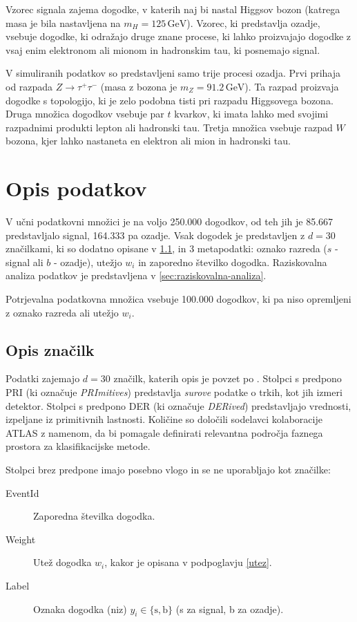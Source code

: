 \documentclass[11pt,a4paper,openany]{book}
\begin{document}
Vzorec signala zajema dogodke, v katerih naj bi nastal Higgsov bozon (katrega masa je bila nastavljena na $m_H = 125\,\text{GeV}$). Vzorec, ki predstavlja ozadje, vsebuje dogodke, ki odražajo druge znane procese, ki lahko proizvajajo dogodke z vsaj enim elektronom ali mionom in hadronskim tau, ki posnemajo signal.

V simuliranih podatkov so predstavljeni samo trije procesi ozadja. Prvi prihaja od razpada $Z \rightarrow \tau^+\tau^-$ (masa z bozona je $m_Z = 91.2\,\text{GeV}$). Ta razpad proizvaja dogodke s topologijo, ki je zelo podobna tisti pri razpadu Higgsovega bozona. Druga množica dogodkov vsebuje par $t$ kvarkov, ki imata lahko med svojimi razpadnimi produkti lepton ali hadronski tau. Tretja množica vsebuje razpad $W$ bozona, kjer lahko nastaneta en elektron ali mion in hadronski tau. 

\section{Opis podatkov}
\label{ch:opis_podatkov}

V učni podatkovni množici je na voljo 250.000 dogodkov, od teh jih je 85.667 predstavljalo signal, 164.333 pa ozadje. Vsak dogodek je predstavljen z $d = 30$ značilkami, ki so dodatno opisane v \ref{sec:opis-znacilk}, in 3 metapodatki: oznako razreda ($s$ - signal ali $b$ - ozadje), utežjo $w_i$ in zaporedno številko dogodka. Raziskovalna analiza podatkov je predstavljena v \ref{sec:raziskovalna-analiza}.

Potrjevalna podatkovna množica vsebuje 100.000 dogodkov, ki pa niso opremljeni z oznako razreda ali utežjo $w_i$. 

\subsection{Opis značilk}
\label{sec:opis-znacilk}
Podatki zajemajo $d = 30$ značilk, katerih opis je povzet po \cite{Adam-Bourdarios14}. Stolpci s predpono PRI (ki označuje \textit{PRImitives}) predstavlja \textit{surove} podatke o trkih, kot jih izmeri detektor. Stolpci s predpono DER (ki označuje \textit{DERived}) predstavljajo vrednosti, izpeljane iz primitivnih lastnosti. Količine so določili sodelavci kolaboracije ATLAS z namenom, da bi pomagale definirati relevantna področja faznega prostora za klasifikacijske metode.

Stolpci brez predpone imajo posebno vlogo in se ne uporabljajo kot značilke:

\begin{changemargin}{0.5cm}{0.0cm} 
\begin{description}
	\item [EventId] 	Zaporedna številka dogodka.
	\item [Weight]  	Utež dogodka $w_i$, kakor je opisana v podpoglavju \ref{utez}.
	\item [Label] 		Oznaka dogodka (niz) $y_i \in \{\text{s}, \text{b}\}$ (s za signal, b za ozadje).	
\end{description}
\end{changemargin}
\end{document}
